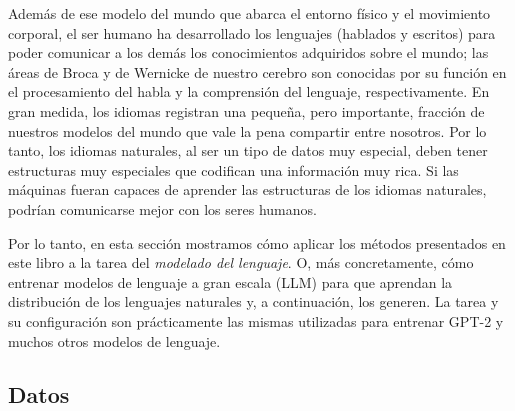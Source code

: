 \documentclass[../../book-main_es.tex]{subfiles}
\begin{document}
Además de ese modelo del mundo que abarca el entorno físico y el movimiento corporal,
el ser humano ha desarrollado los lenguajes (hablados y escritos) para poder comunicar
a los demás los conocimientos adquiridos sobre el mundo;
las áreas de Broca y de Wernicke de nuestro cerebro son conocidas por
su función en el procesamiento del habla y la comprensión del lenguaje, respectivamente. En
gran medida, los idiomas registran una pequeña, pero importante, fracción de
nuestros modelos del mundo que vale la pena compartir entre nosotros. Por lo tanto,
los idiomas naturales, al ser un tipo de datos muy especial, deben tener estructuras muy
especiales que codifican una información muy rica. Si las máquinas
fueran capaces de aprender las estructuras de los idiomas naturales, podrían
comunicarse mejor con los seres humanos.

Por lo tanto, en esta sección mostramos cómo aplicar los métodos presentados
en este libro a la tarea del \textit{modelado del lenguaje}. O, más
concretamente, cómo entrenar modelos de lenguaje a gran escala (LLM) para que aprendan la
distribución de los lenguajes naturales y, a continuación, los generen. La tarea
y su configuración son prácticamente las mismas utilizadas para entrenar GPT-2 y
muchos otros modelos de lenguaje.

\subsection{Datos} \label{sub:clm_text_data}
\end{document}
